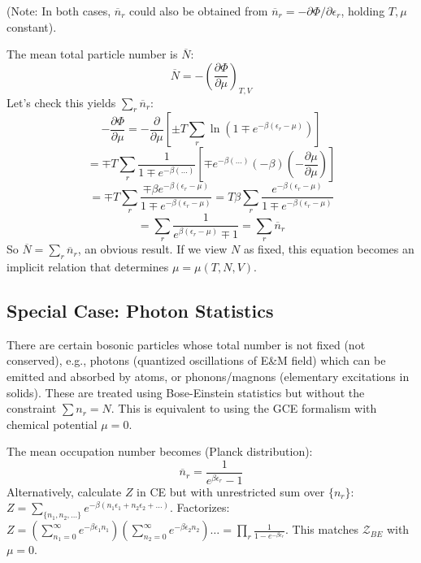 \documentclass[11pt]{article}
\newcommand{\avg}[1]{\overline{#1}}
\newcommand{\pderiv}[2]{\frac{\partial #1}{\partial #2}}
\newcommand{\grandpartfn}{\mathcal{Z}} %
\newcommand{\eps}{\epsilon}
\begin{document}
(Note: In both cases, $\overline{n}_r$ could also be obtained from $\overline{n}_r = -\partial \Phi / \partial \eps_r$, holding $T, \mu$ constant).

The mean total particle number is $\avg{N}$:
\[ \avg{N} = -\left( \pderiv{\Phi}{\mu} \right)_{T,V} \]
Let's check this yields $\sum_r \overline{n}_r$:
\[ -\pderiv{\Phi}{\mu} = -\pderiv{}{\mu} \left[ \pm T \sum_r \ln(1 \mp e^{-\beta(\eps_r-\mu)}) \right] \]
\[ = \mp T \sum_r \frac{1}{1 \mp e^{-\beta(\dots)}} [\mp e^{-\beta(\dots)} (-\beta)(-\pderiv{\mu}{\mu})] \]
\[ = \mp T \sum_r \frac{\mp \beta e^{-\beta(\eps_r-\mu)}}{1 \mp e^{-\beta(\eps_r-\mu)}} = T \beta \sum_r \frac{e^{-\beta(\eps_r-\mu)}}{1 \mp e^{-\beta(\eps_r-\mu)}} \]
\[ = \sum_r \frac{1}{e^{\beta(\eps_r-\mu)} \mp 1} = \sum_r \overline{n}_r \]
So $\avg{N} = \sum_r \overline{n}_r$, an obvious result. If we view $N$ as fixed, this equation becomes an implicit relation that determines $\mu = \mu(T, N, V)$.

\subsection*{Special Case: Photon Statistics}

There are certain bosonic particles whose total number is not fixed (not conserved), e.g., photons (quantized oscillations of E\&M field) which can be emitted and absorbed by atoms, or phonons/magnons (elementary excitations in solids).
These are treated using Bose-Einstein statistics but without the constraint $\sum n_r = N$. This is equivalent to using the GCE formalism with chemical potential $\mu=0$.

The mean occupation number becomes (Planck distribution):
\[ \overline{n}_r = \frac{1}{e^{\beta \eps_r} - 1} \]
Alternatively, calculate $Z$ in CE but with unrestricted sum over $\{n_r\}$:
$Z = \sum_{\{n_1, n_2, \dots\}} e^{-\beta (n_1\eps_1 + n_2\eps_2 + \dots)}$. Factorizes:
$Z = (\sum_{n_1=0}^\infty e^{-\beta\eps_1 n_1}) (\sum_{n_2=0}^\infty e^{-\beta\eps_2 n_2}) \dots = \prod_r \frac{1}{1-e^{-\beta\eps_r}}$.
This matches $\grandpartfn_{BE}$ with $\mu=0$.
\end{document}
